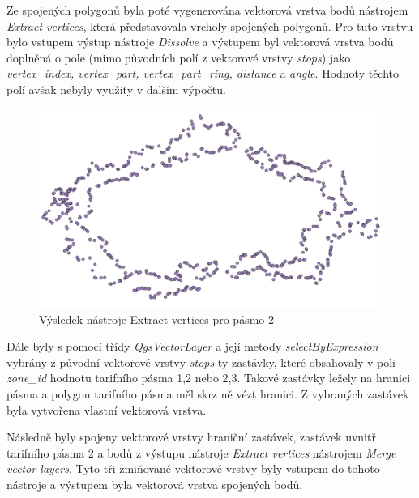 Ze spojených polygonů byla poté vygenerována vektorová vrstva bodů nástrojem
\textit{Extract vertices}, která představovala vrcholy spojených polygonů. Pro tuto vrstvu
bylo vstupem výstup nástroje \textit{Dissolve} a výstupem byl vektorová vrstva bodů 
doplněná o pole (mimo původních polí z vektorové vrstvy \textit{stops}) jako \textit{vertex\_index,
vertex\_part, vertex\_part\_ring, distance} a \textit{angle}.
Hodnoty těchto polí avšak nebyly využity v dalším výpočtu.

\begin{figure}[H] \centering
    \includegraphics[width=400pt]{./pictures/vertices.png}
    \caption[Výsledek nástroje Extract vertices pro pásmo 2]{Výsledek nástroje Extract vertices pro pásmo 2}
	\label{fig:vertices}              
\end{figure} 

Dále byly s pomocí třídy \textit{QgsVectorLayer} a její metody \textit{selectByExpression} vybrány 
z původní vektorové vrstvy \textit{stops} ty zastávky, které obsahovaly v poli \textit{zone\_id}
hodnotu tarifního pásma 1,2 nebo 2,3. Takové zastávky ležely na hranici pásma a polygon tarifního pásma
měl skrz ně vézt hranici. Z vybraných zastávek byla vytvořena vlastní vektorová vrstva. 

Následně byly spojeny vektorové vrstvy hraniční zastávek, zastávek uvnitř tarifního pásma 2 a
bodů z výstupu nástroje \textit{Extract vertices} nástrojem \textit{Merge vector layers}.
Tyto tři zmiňované vektorové vrstvy byly vstupem do tohoto nástroje a výstupem byla 
vektorová vrstva spojených bodů. 

